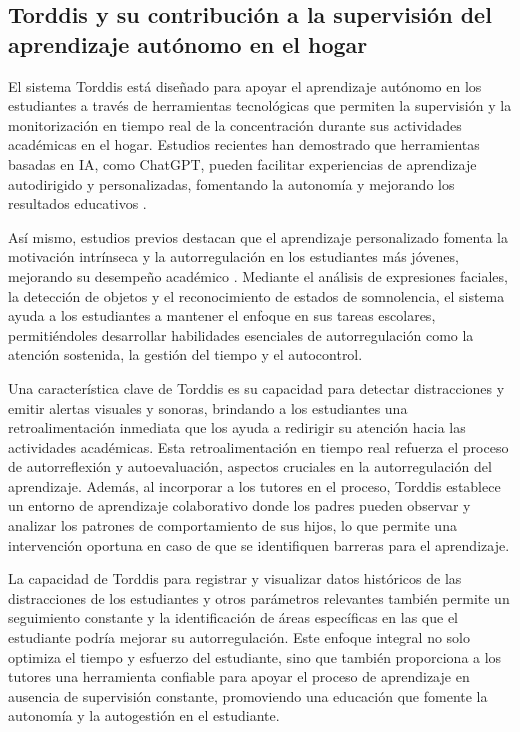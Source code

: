 \documentclass[a4paper,fleqn]{cas-sc}
\begin{document}
		\subsection{Torddis y su contribución a la supervisión del aprendizaje autónomo en el hogar}		
			El sistema Torddis está diseñado para apoyar el aprendizaje autónomo en los estudiantes a través de herramientas tecnológicas que permiten la supervisión y la monitorización en tiempo real de la concentración durante sus actividades académicas en el hogar. Estudios recientes han demostrado que herramientas basadas en IA, como ChatGPT, pueden facilitar experiencias de aprendizaje autodirigido y personalizadas, fomentando la autonomía y mejorando los resultados educativos \cite{Li2024Systematic}.
			
			Así mismo, estudios previos destacan que el aprendizaje personalizado fomenta la motivación intrínseca y la autorregulación en los estudiantes más jóvenes, mejorando su desempeño académico \cite{Ackermans2025Young}. Mediante el análisis de expresiones faciales, la detección de objetos y el reconocimiento de estados de somnolencia, el sistema ayuda a los estudiantes a mantener el enfoque en sus tareas escolares, permitiéndoles desarrollar habilidades esenciales de autorregulación como la atención sostenida, la gestión del tiempo y el autocontrol.
			
			Una característica clave de Torddis es su capacidad para detectar distracciones y emitir alertas visuales y sonoras, brindando a los estudiantes una retroalimentación inmediata que los ayuda a redirigir su atención hacia las actividades académicas. Esta retroalimentación en tiempo real refuerza el proceso de autorreflexión y autoevaluación, aspectos cruciales en la autorregulación del aprendizaje. Además, al incorporar a los tutores en el proceso, Torddis establece un entorno de aprendizaje colaborativo donde los padres pueden observar y analizar los patrones de comportamiento de sus hijos, lo que permite una intervención oportuna en caso de que se identifiquen barreras para el aprendizaje.
			
			La capacidad de Torddis para registrar y visualizar datos históricos de las distracciones de los estudiantes y otros parámetros relevantes también permite un seguimiento constante y la identificación de áreas específicas en las que el estudiante podría mejorar su autorregulación. Este enfoque integral no solo optimiza el tiempo y esfuerzo del estudiante, sino que también proporciona a los tutores una herramienta confiable para apoyar el proceso de aprendizaje en ausencia de supervisión constante, promoviendo una educación que fomente la autonomía y la autogestión en el estudiante.
		
\end{document}
